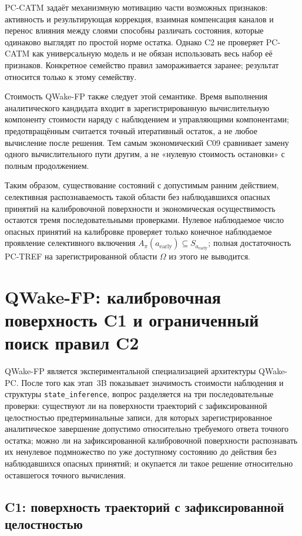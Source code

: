 PC-CATM задаёт механизмную мотивацию части возможных признаков: активность и
результирующая коррекция, взаимная компенсация каналов и перенос влияния между
слоями способны различать состояния, которые одинаково выглядят по простой
норме остатка. Однако C2 не проверяет PC-CATM как универсальную модель и не
обязан использовать весь набор её признаков. Конкретное семейство правил
замораживается заранее; результат относится только к этому семейству.

Стоимость QWake-FP также следует этой семантике. Время выполнения
аналитического кандидата входит в зарегистрированную вычислительную компоненту
стоимости наряду с наблюдением и управляющими компонентами; предотвращённым
считается точный итеративный остаток, а не любое вычисление после решения. Тем
самым экономический C09 сравнивает замену одного вычислительного пути другим, а
не «нулевую стоимость остановки» с полным продолжением.

Таким образом, существование состояний с допустимым ранним действием,
селективная распознаваемость такой области без наблюдавшихся опасных принятий на
калибровочной поверхности и экономическая осуществимость остаются тремя
последовательными проверками. Нулевое наблюдаемое число опасных принятий на
калибровке проверяет только
конечное наблюдаемое проявление селективного включения
$A_{\pi}(a_{\mathrm{early}})\subseteq S_{a_{\mathrm{early}}}$; полная
достаточность PC-TREF на зарегистрированной области $\Omega$ из этого не выводится.

\section{QWake-FP: калибровочная поверхность C1 и ограниченный поиск правил C2}
\label{sec:method-qwake}

QWake-FP является экспериментальной специализацией архитектуры QWake-PC. После того как
этап~3B показывает значимость стоимости наблюдения и структуры
\texttt{state\_inference}, вопрос разделяется на три последовательные проверки:
существуют ли на поверхности траекторий с зафиксированной целостностью
предтерминальные записи, для которых зарегистрированное аналитическое завершение допустимо
относительно требуемого ответа точного остатка; можно ли на
зафиксированной калибровочной поверхности распознавать их ненулевое подмножество
по уже доступному состоянию до действия без наблюдавшихся опасных принятий; и
окупается ли такое решение относительно оставшегося точного вычисления.

\subsection{C1: поверхность траекторий с зафиксированной целостностью}

